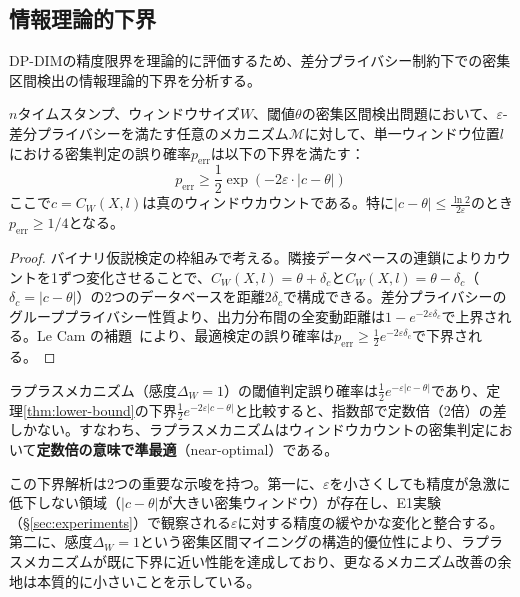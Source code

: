 \subsection{情報理論的下界}\label{subsec:lower-bound}

DP-DIMの精度限界を理論的に評価するため、差分プライバシー制約下での密集区間検出の情報理論的下界を分析する。

\begin{theorem}[DP密集区間検出の精度下界]\label{thm:lower-bound}
$n$タイムスタンプ、ウィンドウサイズ$W$、閾値$\theta$の密集区間検出問題において、$\varepsilon$-差分プライバシーを満たす任意のメカニズム$\mathcal{M}$に対して、単一ウィンドウ位置$l$における密集判定の誤り確率$p_{\text{err}}$は以下の下界を満たす：
\[
p_{\text{err}} \geq \frac{1}{2}\exp\left(-2\varepsilon \cdot |c - \theta|\right)
\]
ここで$c = C_W(X, l)$は真のウィンドウカウントである。特に$|c - \theta| \leq \frac{\ln 2}{2\varepsilon}$のとき$p_{\text{err}} \geq 1/4$となる。
\end{theorem}

\begin{proof}
バイナリ仮説検定の枠組みで考える。隣接データベースの連鎖によりカウントを1ずつ変化させることで、$C_W(X,l) = \theta + \delta_c$と$C_W(X,l) = \theta - \delta_c$（$\delta_c = |c - \theta|$）の2つのデータベースを距離$2\delta_c$で構成できる。差分プライバシーのグループプライバシー性質より、出力分布間の全変動距離は$1 - e^{-2\varepsilon\delta_c}$で上界される。Le Cam の補題~\cite{lecam1973convergence}により、最適検定の誤り確率は$p_{\text{err}} \geq \frac{1}{2}e^{-2\varepsilon\delta_c}$で下界される。
\end{proof}

\begin{corollary}[ラプラスメカニズムの準最適性]\label{cor:near-optimal}
ラプラスメカニズム（感度$\Delta_W = 1$）の閾値判定誤り確率は$\frac{1}{2}e^{-\varepsilon|c - \theta|}$であり、定理\ref{thm:lower-bound}の下界$\frac{1}{2}e^{-2\varepsilon|c-\theta|}$と比較すると、指数部で定数倍（2倍）の差しかない。すなわち、ラプラスメカニズムはウィンドウカウントの密集判定において\textbf{定数倍の意味で準最適}（near-optimal）である。
\end{corollary}

この下界解析は2つの重要な示唆を持つ。第一に、$\varepsilon$を小さくしても精度が急激に低下しない領域（$|c - \theta|$が大きい密集ウィンドウ）が存在し、E1実験（\S\ref{sec:experiments}）で観察される$\varepsilon$に対する精度の緩やかな変化と整合する。第二に、感度$\Delta_W = 1$という密集区間マイニングの構造的優位性により、ラプラスメカニズムが既に下界に近い性能を達成しており、更なるメカニズム改善の余地は本質的に小さいことを示している。


